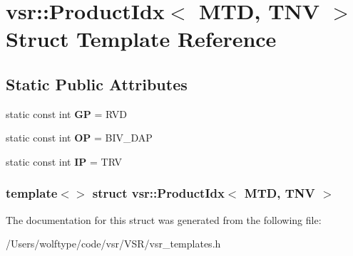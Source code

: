 \hypertarget{structvsr_1_1_product_idx_3_01_m_t_d_00_01_t_n_v_01_4}{\section{vsr\-:\-:Product\-Idx$<$ M\-T\-D, T\-N\-V $>$ Struct Template Reference}
\label{structvsr_1_1_product_idx_3_01_m_t_d_00_01_t_n_v_01_4}
}
\subsection*{Static Public Attributes}
\begin{DoxyCompactItemize}
\item 
\hypertarget{structvsr_1_1_product_idx_3_01_m_t_d_00_01_t_n_v_01_4_a30ca9e9b0797aed94abb7784e7fd20b5}{static const int {\bfseries G\-P} = R\-V\-D}\label{structvsr_1_1_product_idx_3_01_m_t_d_00_01_t_n_v_01_4_a30ca9e9b0797aed94abb7784e7fd20b5}

\item 
\hypertarget{structvsr_1_1_product_idx_3_01_m_t_d_00_01_t_n_v_01_4_af5792f2df8433585f9bd7678b1cd8aba}{static const int {\bfseries O\-P} = B\-I\-V\-\_\-\-D\-A\-P}\label{structvsr_1_1_product_idx_3_01_m_t_d_00_01_t_n_v_01_4_af5792f2df8433585f9bd7678b1cd8aba}

\item 
\hypertarget{structvsr_1_1_product_idx_3_01_m_t_d_00_01_t_n_v_01_4_a209626b98199a4124ceac30dc8cc8dd3}{static const int {\bfseries I\-P} = T\-R\-V}\label{structvsr_1_1_product_idx_3_01_m_t_d_00_01_t_n_v_01_4_a209626b98199a4124ceac30dc8cc8dd3}

\end{DoxyCompactItemize}
\subsubsection*{template$<$$>$ struct vsr\-::\-Product\-Idx$<$ M\-T\-D, T\-N\-V $>$}



The documentation for this struct was generated from the following file\-:\begin{DoxyCompactItemize}
\item 
/\-Users/wolftype/code/vsr/\-V\-S\-R/vsr\-\_\-templates.\-h\end{DoxyCompactItemize}
